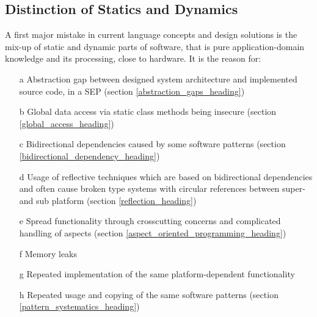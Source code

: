 %
%
%
%
%
%
%

\subsection{Distinction of Statics and Dynamics}
\label{distinction_of_statics_and_dynamics_heading}

A first major mistake in current language concepts and design solutions is the
mix-up of static and dynamic parts of software, that is pure application-domain
knowledge and its processing, close to hardware. It is the reason for:

\begin{itemize}
    \item[a] Abstraction gap between designed system architecture and implemented
        source code, in a SEP (section \ref{abstraction_gaps_heading})
    \item[b] Global data access via static class methods being insecure
        (section \ref{global_access_heading})
    \item[c] Bidirectional dependencies caused by some software patterns
        (section \ref{bidirectional_dependency_heading})
    \item[d] Usage of reflective techniques which are based on bidirectional
        dependencies and often cause broken type systems with circular
        references between super- and sub platform (section \ref{reflection_heading})
    \item[e] Spread functionality through crosscutting concerns and complicated
        handling of aspects (section \ref{aspect_oriented_programming_heading})
    \item[f] Memory leaks
    \item[g] Repeated implementation of the same platform-dependent functionality
    \item[h] Repeated usage and copying of the same software patterns (section
        \ref{pattern_systematics_heading})
\end{itemize}

